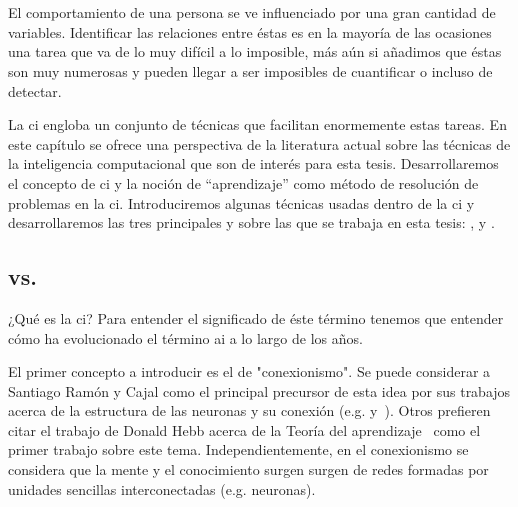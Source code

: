 \chapter{}
\label{ch:sota-ci}

El comportamiento de una persona se ve influenciado por una gran cantidad de variables. Identificar las relaciones entre éstas es en la mayoría de las ocasiones una tarea que va de lo muy difícil a lo imposible, más aún si añadimos que éstas son muy numerosas y pueden llegar a ser imposibles de cuantificar o incluso de detectar.

La \ac{ci} engloba un conjunto de técnicas que facilitan enormemente estas tareas. En este capítulo se ofrece una perspectiva de la literatura actual sobre las técnicas de la inteligencia computacional que son de interés para esta tesis. Desarrollaremos el concepto de \ac{ci} y la noción de \enquote{aprendizaje} como método de resolución de problemas en la \ac{ci}. Introduciremos algunas técnicas usadas dentro de la \ac{ci} y desarrollaremos las tres principales y sobre las que se trabaja en esta tesis: ,  y .

\section{ vs. }

¿Qué es la \ac{ci}? Para entender el significado de éste término tenemos que entender cómo ha evolucionado el término \ac{ai} a lo largo de los años.

El primer concepto a introducir es el de "conexionismo". Se puede considerar a Santiago Ramón y Cajal como el principal precursor de esta idea por sus trabajos acerca de la estructura de las neuronas y su conexión (e.g. \cite{y1888estructura} y~\cite{ramon1904textura}). Otros prefieren citar el trabajo de Donald Hebb acerca de la Teoría del aprendizaje~\cite{hebb19680} como el primer trabajo sobre este tema. Independientemente, en el conexionismo se considera que la mente y el conocimiento surgen surgen de redes formadas por unidades sencillas interconectadas (e.g. neuronas).

